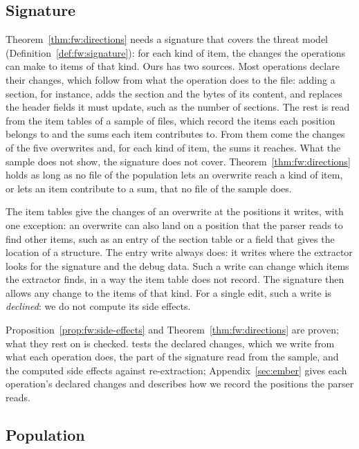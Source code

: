 \subsection{Signature}
\label{sec:instances:signature}

Theorem~\ref{thm:fw:directions} needs a signature that covers the threat model (Definition~\ref{def:fw:signature}):
for each kind of item, the changes the operations can make to items of that kind. Ours has two sources. Most
operations declare their changes, which follow from what the operation does to the file: adding a section, for
instance, adds the section and the bytes of its content, and replaces the header fields it must update, such as the
number of sections. The rest is read from the item tables of a sample of files, which record the items each position
belongs to and the sums each item contributes to. From them come the changes of the five overwrites and, for each kind of item, the
sums it reaches. What the sample does not show, the signature does not cover. Theorem~\ref{thm:fw:directions} holds as long as no file of the population lets an
overwrite reach a kind of item, or lets an item contribute to a sum, that no file of the sample does.

The item tables give the changes of an overwrite at the positions it writes, with one exception: an overwrite can
also land on a position that the parser reads to find other items, such as an entry of the section table or a field
that gives the location of a structure. The entry write always does: it writes
where the extractor looks for the signature and the debug data. Such a write can change which items the
extractor finds, in a way the item table does not record. The signature then allows any change to the items of that
kind. For a single edit, such a write is \emph{declined}: we do not compute its side effects.

Proposition~\ref{prop:fw:side-effects} and Theorem~\ref{thm:fw:directions} are proven; what they rest on is checked.
 tests the declared changes, which we write from what each operation does, the part of the
signature read from the sample, and the computed side effects against re-extraction; Appendix~\ref{sec:ember} gives each operation's declared changes and describes how we record the
positions the parser reads.

\subsection{Population}
\label{sec:instances:population}

